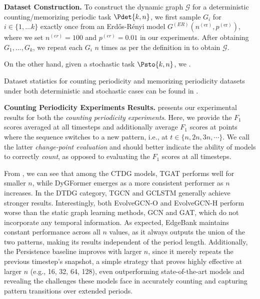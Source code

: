 \textbf{Dataset Construction.} To construct the dynamic graph $\mathcal{G}$ for a deterministic counting/memorizing periodic task $\Pdet{k, n}$, we first sample $G_i$ for $i \in \{ 1, \dots k \}$ exactly once from an Erdős-Rényi model \citep{erdos1960evolution} $G^{(ER)}(n^{(\text{er})}, p^{(\text{er})})$, where we set $n^{(er)} = 100$ and $p^{(er)} = 0.01$ in our experiments. After obtaining $G_1, \dots, G_k$, we repeat each $G_i$ $n$ times as per the definition in  to obtain $\mathcal{G}$.

On the other hand, given a stochastic task $\Psto{k, n}$, we .

Dataset statistics for counting periodicity and memorizing periodicity datasets under both deterministic and stochastic cases can be found in .

\textbf{Counting Periodicity Experiments Results.}  
 presents our experimental results for both the \textit{counting periodicity experiments}. Here, we provide the $F_1$ scores averaged at all timesteps and additionally average $F_1$ scores at points where the sequence switches to a new pattern, i.e., at $t \in \{ n, 2n, 3n, \cdots \}$. We call the latter \textit{change-point evaluation} and should better indicate the ability of models to correctly \textit{count}, as opposed to evaluating the $F_1$ scores at all timesteps. 


From , we can see that among the CTDG models, TGAT performs well for smaller $n$, while DyGFormer emerges as a more consistent performer as $n$ increases. In the DTDG category, TGCN and GCLSTM generally achieve stronger results. Interestingly, both EvolveGCN-O and EvolveGCN-H perform worse than the static graph learning methods, GCN and GAT, which do not incorporate any temporal information. As expected, EdgeBank maintains constant performance across all $n$ values, as it always outputs the union of the two patterns, making its results independent of the period length. Additionally, the Persistence baseline improves with larger $n$, since it merely repeats the previous timestep’s snapshot, a simple strategy that proves highly effective at larger $n$ (e.g., 16, 32, 64, 128), even outperforming state-of-the-art models and revealing the challenges these models face in accurately counting and capturing pattern transitions over extended periods.

